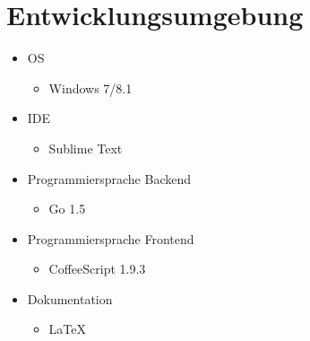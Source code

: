 \section{Entwicklungsumgebung}

\begin{itemize}
	\item OS
	\begin{itemize}
		\item Windows 7/8.1
	\end{itemize}
	\item IDE
	\begin{itemize}
		\item Sublime Text
	\end{itemize}
	\item Programmiersprache Backend
	\begin{itemize}
		\item Go 1.5
	\end{itemize}
	\item Programmiersprache Frontend
	\begin{itemize}
		\item CoffeeScript 1.9.3
	\end{itemize}
	\item Dokumentation
	\begin{itemize}
		\item LaTeX
	\end{itemize}
\end{itemize}